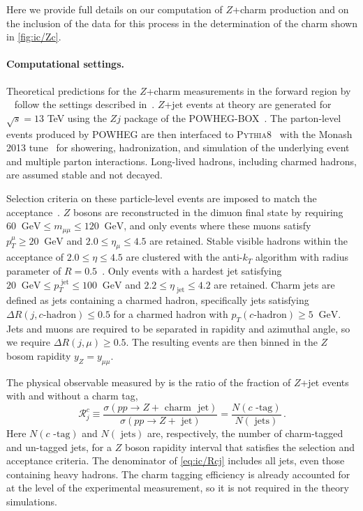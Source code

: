 
Here we provide full details on our computation of  $Z$+charm
production and on the inclusion of the \lhcb data for this
process in the determination of the charm \pdf shown in
\cref{fig:ic/Zc}. 

\paragraph{Computational settings.}
%
Theoretical predictions for
the $Z$+charm measurements in the forward region 
by \lhcb~\cite{LHCb:2021stx} follow the 
 settings described in~\cite{Boettcher:2015sqn}.
%
$Z$+jet events at \nlo \qcd theory are generated for $\sqrt{s}= 13$ TeV  using the $Zj$ package of the
\textsc{\small POWHEG-BOX}~\cite{Alioli:2010xd}.
%
The parton-level events produced by \textsc{\small POWHEG}
are then interfaced to \textsc{\small Pythia8}~\cite{Sjostrand:2007gs}
with the Monash 2013 tune~\cite{Skands:2014pea} for showering,
hadronization, and simulation of the underlying event and multiple
parton interactions.
%
Long-lived hadrons, including charmed hadrons,
are assumed stable and not decayed.

Selection criteria on these particle-level events are imposed
to match the \lhcb acceptance~\cite{LHCb:2021stx}.
%
$Z$ bosons are reconstructed in the dimuon final state by
requiring $60~\textrm{ GeV}\le m_{\mu\mu} \le 120~\textrm{ GeV}$,
and
only events where these muons satisfy
    $p_T^\mu \ge 20~\textrm{ GeV}$ and $2.0 \le \eta_{\mu}\le 4.5$
    are retained.
%
Stable visible hadrons within the \lhcb acceptance of
$2.0 \le \eta \le 4.5$ are clustered with
the anti-$k_T$ algorithm with radius parameter
of $R=0.5$~\cite{Cacciari:2008gp}.
%
Only events with a hardest jet satisfying
  $ 20~\textrm{ GeV} \le p_T^\textrm{ jet} \le 100~\textrm{ GeV}$
and $2.2 \le \eta_\textrm{ jet}\le 4.2$ are retained.
%
Charm jets are defined as jets containing
a charmed hadron, specifically  jets satisfying
$\Delta R(j, c\textrm{-hadron})\le 0.5$ for a charmed
hadron with $p_T(c\textrm{-hadron})\ge 5~\textrm{ GeV}$.
%
Jets and muons are required to be separated
in rapidity and azimuthal angle, so
we require $\Delta R(j, \mu)\ge 0.5$.
%
The resulting events
are then binned in the $Z$ bosom rapidity $y_Z = y_{\mu \mu}$.

The physical observable measured by \lhcb is the ratio of the fraction of $Z$+jet
    events with and without a charm tag,
    \begin{equation}
    \label{eq:ic/Rcj}
        \mathcal{R}_j^c \equiv \frac{\sigma(pp\to Z+\textrm{ charm~ jet})}{\sigma(pp \to Z+\textrm{ jet})}=
         \frac{N(c\textrm{ -tag})}{ 
        N(\textrm{ jets})} \, .
    \end{equation}
 Here  $N(c\textrm{ -tag})$ and $N(\textrm{ jets})$ are, respectively, the number
    of charm-tagged and un-tagged jets, for a  $Z$ boson rapidity interval
    that satisfies the selection and acceptance criteria.
    The denominator of \cref{eq:ic/Rcj} includes all jets, even those
    containing heavy hadrons.
The charm tagging efficiency is already accounted for at the level
of the experimental measurement, so it is not required in the theory
simulations.

